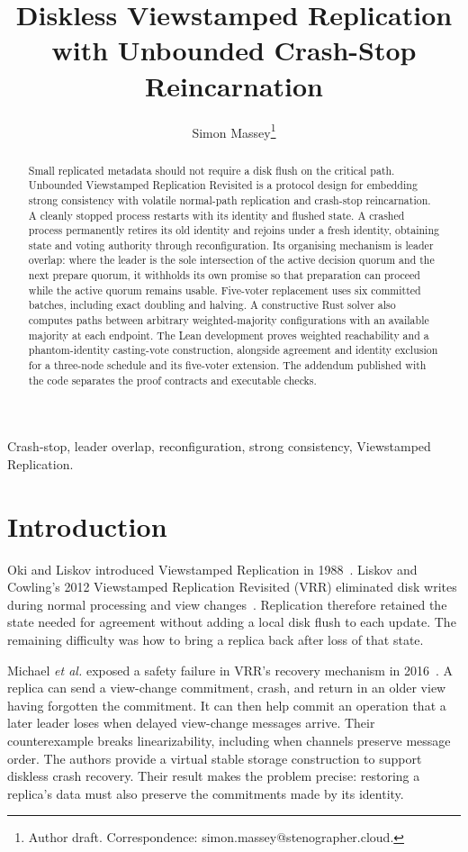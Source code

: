 \documentclass[10pt,journal,letterpaper]{IEEEtran}
\title{Diskless Viewstamped Replication\\with Unbounded Crash-Stop Reincarnation}
\author{Simon Massey\thanks{Author draft. Correspondence: simon.massey@stenographer.cloud.}}
\begin{document}
\maketitle
\thispagestyle{fancy}

\begin{abstract}
Small replicated metadata should not require a disk flush on the critical path.
Unbounded Viewstamped Replication Revisited is a protocol design for embedding
strong consistency with volatile normal-path replication and crash-stop
reincarnation.
A cleanly stopped process restarts with its identity and flushed state.
A crashed process permanently retires its old identity and rejoins under a fresh
identity, obtaining state and voting authority through reconfiguration.
Its organising mechanism is leader overlap: where the leader is the sole
intersection of the active decision quorum and the next prepare quorum, it
withholds its own promise so that preparation can proceed while the active
quorum remains usable.
Five-voter replacement uses six committed batches, including exact doubling
and halving. A constructive Rust solver also computes paths between arbitrary
weighted-majority configurations with an available majority at each endpoint.
The Lean development proves weighted reachability and a phantom-identity
casting-vote construction, alongside agreement and identity exclusion for a
three-node schedule and its five-voter extension. The addendum published
with the code separates the proof contracts and executable checks.
\end{abstract}

\begin{IEEEkeywords}
Crash-stop, leader overlap, reconfiguration, strong consistency, Viewstamped Replication.
\end{IEEEkeywords}

\section{Introduction}\label{sec:intro}
Oki and Liskov introduced Viewstamped Replication in 1988~\cite{vr}.
Liskov and Cowling's 2012 Viewstamped Replication Revisited (VRR) eliminated
disk writes during normal processing and view changes~\cite{vrr}.
Replication therefore retained the state needed for agreement without adding a
local disk flush to each update. The remaining difficulty was how to bring a
replica back after loss of that state.

Michael \emph{et al.} exposed a safety failure in VRR's recovery mechanism in
2016~\cite[Sec.~4.2 and Appendix~A.1]{diskless}.
A replica can send a view-change commitment, crash, and return in an older view
having forgotten the commitment.
It can then help commit an operation that a later leader loses when delayed
view-change messages arrive.
Their counterexample breaks linearizability, including when channels preserve
message order.
The authors provide a virtual stable storage construction to support diskless
crash recovery.
Their result makes the problem precise: restoring a replica's data must also
preserve the commitments made by its identity.
\end{document}
